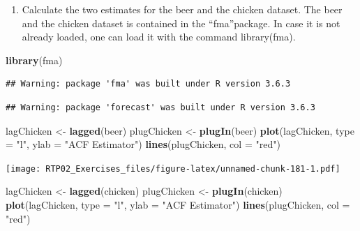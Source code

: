 \documentclass[
]{article}
\newenvironment{Shaded}{\begin{snugshade}}{\end{snugshade}}
\newcommand{\DataTypeTok}[1]{\textcolor[rgb]{0.13,0.29,0.53}{#1}}
\newcommand{\KeywordTok}[1]{\textcolor[rgb]{0.13,0.29,0.53}{\textbf{#1}}}
\newcommand{\NormalTok}[1]{#1}
\newcommand{\StringTok}[1]{\textcolor[rgb]{0.31,0.60,0.02}{#1}}
\providecommand{\tightlist}{%
  \setlength{\itemsep}{0pt}\setlength{\parskip}{0pt}}
\begin{document}
\begin{enumerate}
\def\labelenumi{\alph{enumi})}
\setcounter{enumi}{2}
\tightlist
\item
  Calculate the two estimates for the beer and the chicken dataset. The
  beer and the chicken dataset is contained in the ``fma''package. In
  case it is not already loaded, one can load it with the command
  library(fma).
\end{enumerate}

\begin{Shaded}
\begin{Highlighting}[]
\KeywordTok{library}\NormalTok{(fma)}
\end{Highlighting}
\end{Shaded}

\begin{verbatim}
## Warning: package 'fma' was built under R version 3.6.3
\end{verbatim}

\begin{verbatim}
## Warning: package 'forecast' was built under R version 3.6.3
\end{verbatim}

\begin{Shaded}
\begin{Highlighting}[]
\NormalTok{lagChicken <-}\StringTok{ }\KeywordTok{lagged}\NormalTok{(beer)}
\NormalTok{plugChicken <-}\StringTok{ }\KeywordTok{plugIn}\NormalTok{(beer)}
\KeywordTok{plot}\NormalTok{(lagChicken, }\DataTypeTok{type =} \StringTok{"l"}\NormalTok{, }\DataTypeTok{ylab =} \StringTok{"ACF Estimator"}\NormalTok{)}
\KeywordTok{lines}\NormalTok{(plugChicken, }\DataTypeTok{col =} \StringTok{"red"}\NormalTok{)}
\end{Highlighting}
\end{Shaded}

\texttt{[image: RTP02\_Exercises\_files/figure-latex/unnamed-chunk-181-1.pdf]}

\begin{Shaded}
\begin{Highlighting}[]
\NormalTok{lagChicken <-}\StringTok{ }\KeywordTok{lagged}\NormalTok{(chicken)}
\NormalTok{plugChicken <-}\StringTok{ }\KeywordTok{plugIn}\NormalTok{(chicken)}
\KeywordTok{plot}\NormalTok{(lagChicken, }\DataTypeTok{type =} \StringTok{"l"}\NormalTok{, }\DataTypeTok{ylab =} \StringTok{"ACF Estimator"}\NormalTok{)}
\KeywordTok{lines}\NormalTok{(plugChicken, }\DataTypeTok{col =} \StringTok{"red"}\NormalTok{)}
\end{Highlighting}
\end{Shaded}
\end{document}
